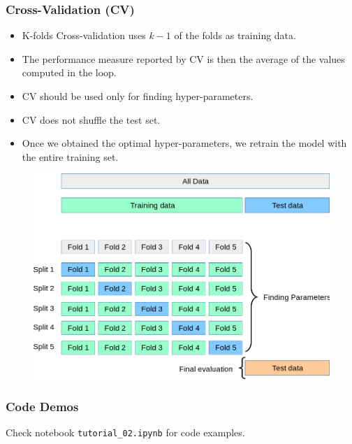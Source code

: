\documentclass[aspectratio=169, 10pt]{beamer}
\begin{document}
\begin{frame}
    \frametitle{Cross-Validation (CV)}
    
    \begin{itemize}
        \item K-folds Cross-validation uses $k-1$ of the folds as training data.
        \item The performance measure reported by CV is then the average of the values computed in the loop. 
        \item CV should be used only for finding hyper-parameters. 
        \item CV does not shuffle the test set.
        \item Once we obtained the optimal hyper-parameters, we retrain the model with the entire training set.
    \end{itemize}
    
    \begin{figure}
        \centering
        \includegraphics[width=0.45\columnwidth]{../imgs/grid_search_cross_validation.png}
    \end{figure}

\end{frame}

\begin{frame}
    \frametitle{Code Demos}
    
    Check notebook \texttt{tutorial\_02.ipynb} for code examples.

\end{frame}
\end{document}
